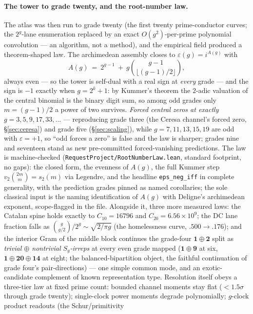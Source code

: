 \documentclass[11pt]{article}
\theoremstyle{definition}
\theoremstyle{remark}
\begin{document}
\paragraph{The tower to grade twenty, and the root-number law.} The atlas was
then run to grade twenty (the first twenty prime-conductor curves; the
$2^g$-lane enumeration replaced by an exact $O(g^2)$-per-prime polynomial
convolution --- an algorithm, not a method), and the empirical field produced
a theorem-shaped law. The archimedean assembly closes to
$\varepsilon(g)=i^{A(g)}$ with
\[
  A(g)\ =\ 2^{g-1}\ +\ g\binom{g-1}{\lfloor (g-1)/2\rfloor},
\]
always even --- so the tower is self-dual with a real sign at \emph{every}
grade --- and the sign is $-1$ exactly when $g=2^k+1$: by Kummer's theorem
the $2$-adic valuation of the central binomial is the binary digit sum, so
among odd grades only $m=(g-1)/2$ a power of two survives. \emph{Forced
central zeros at exactly $g=3,5,9,17,33,\dots$} --- reproducing grade three
(the Ceresa channel's forced zero, \S\ref{sec:ceresa}) and grade five
(\S\ref{sec:scaling}), while $g=7,11,13,15,19$ are odd with $\varepsilon=+1$,
so ``odd forces a zero'' is false and the law is sharper; grades nine and
seventeen stand as new pre-committed forced-vanishing predictions. The law
is machine-checked (\texttt{RequestProject/RootNumberLaw.lean}, standard
footprint, no gaps): the closed form, the evenness of $A(g)$, the full
Kummer step $v_2\binom{2m}{m}=s_2(m)$ via Legendre, and the headline
\texttt{eps\_neg\_iff} in complete generality, with the prediction grades
pinned as named corollaries; the sole classical input is the naming
identification of $A(g)$ with Deligne's archimedean exponent, scope-flagged
in the file. Alongside
it, three more measured laws: the Catalan spine holds exactly to
$C_{10}=16796$ and $C_{20}=6.56\times10^9$; the DC lane fraction falls as
$\binom{g}{g/2}/2^g\sim\sqrt{2/\pi g}$ (the homelessness curve,
$.500\to.176$); and the interior Gram of the middle block continues the
grade-four $\mathbf 1\oplus\mathbf 2$ split as
\emph{trivial $\oplus$ nontrivial $S_g$-irreps} at every even grade mapped
($\mathbf 1\oplus\mathbf 9$ at six, $\mathbf 1\oplus\mathbf{20}
\oplus\mathbf{14}$ at eight; the balanced-bipartition object, the faithful
continuation of grade four's pair-directions) --- one simple common mode, and
an exotic-candidate complement of known representation type. Resolution
itself obeys a three-tier law at fixed prime count: bounded channel moments
stay flat ($<1.5\sigma$ through grade twenty); single-clock power moments
degrade polynomially; $g$-clock product readouts (the Schur/primitivity
\end{document}
